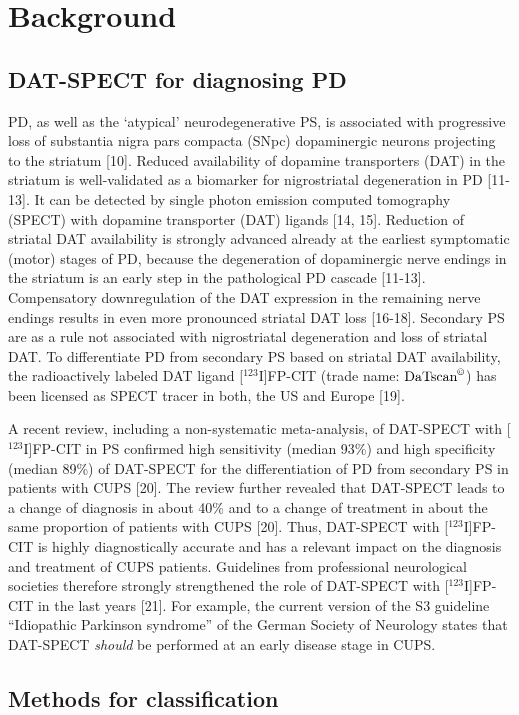\section{Background}
\label{sec:background}

\subsection{DAT-SPECT for diagnosing PD}
\label{subsec:datspect}


PD, as well as the `atypical' neurodegenerative PS, is associated with progressive loss of substantia nigra pars compacta (SNpc) dopaminergic neurons 
projecting to the striatum [10]. 
Reduced availability of dopamine transporters (DAT) in the striatum is well-validated as a biomarker for nigrostriatal degeneration in PD [11-13]. 
It can be detected by single photon emission computed tomography (SPECT) with dopamine transporter (DAT) ligands [14, 15]. 
Reduction of striatal DAT availability is strongly advanced already at the earliest symptomatic (motor) stages of PD, 
because the degeneration of dopaminergic nerve endings in the striatum is an early step in the pathological PD cascade [11-13]. 
Compensatory downregulation of the DAT expression in the remaining nerve endings results in even more pronounced striatal DAT loss [16-18]. 
Secondary PS are as a rule not associated with nigrostriatal degeneration and loss of striatal DAT. 
To differentiate PD from secondary PS based on striatal DAT availability, the radioactively labeled DAT ligand [$^{123}$I]FP-CIT 
(trade name: $\text{DaTscan}^{\copyright}$) has been licensed as SPECT tracer in both, the US and Europe [19].


A recent review, including a non-systematic meta-analysis, of DAT-SPECT with [$^{123}$I]FP-CIT in PS confirmed high sensitivity (median 93\%) 
and high specificity (median 89\%) of DAT-SPECT for the differentiation of PD from secondary PS in patients with CUPS [20]. 
The review further revealed that DAT-SPECT leads to a change of diagnosis in about 40\% and to a change of treatment in about the same proportion of 
patients with CUPS [20]. 
Thus, DAT-SPECT with [$^{123}$I]FP-CIT is highly diagnostically accurate and has a relevant impact on the diagnosis and treatment of CUPS patients. 
Guidelines from professional neurological societies therefore strongly strengthened the role of DAT-SPECT with [$^{123}$I]FP-CIT in the last years [21]. 
For example, the current version of the S3 guideline “Idiopathic Parkinson syndrome” of the German Society of Neurology states that DAT-SPECT 
\textit{should} be performed at an early disease stage in CUPS. 


\subsection{Methods for classification}
\label{subsec:randfors}


